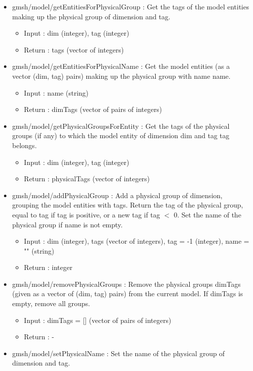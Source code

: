 \documentclass[dvipdfmx, 9pt, a4paper]{article}
\numberwithin{equation}{section}
\begin{document}
\begin{itemize}
\item gmsh/model/getEntitiesForPhysicalGroup : Get the tags of the model entities making up the physical group of dimension and tag.
\begin{itemize}
\item Input : dim (integer), tag (integer)
\item Return : tags (vector of integers)
\end{itemize}
\item gmsh/model/getEntitiesForPhysicalName : Get the model entities (as a vector (dim, tag) pairs) making up the physical group
with name name.
\begin{itemize}
\item Input : name (string)
\item Return : dimTags (vector of pairs of integers)
\end{itemize}
\item gmsh/model/getPhysicalGroupsForEntity : Get the tags of the physical groups (if any) to which the model entity of dimension dim and tag tag belongs.
\begin{itemize}
\item Input : dim (integer), tag (integer)
\item Return : physicalTags (vector of integers)
\end{itemize}
\item gmsh/model/addPhysicalGroup : Add a physical group of dimension, grouping the model entities with tags. Return the tag of the physical group, equal to tag if tag is positive, or a new tag if tag $<$ 0. Set the name of the physical group if name is not empty.
\begin{itemize}
\item Input : dim (integer), tags (vector of integers), tag = -1 (integer), name = "" (string)
\item Return : integer
\end{itemize}
\item gmsh/model/removePhysicalGroups : Remove the physical groups dimTags (given as a vector of (dim, tag) pairs) from the current model. If dimTags is empty, remove all groups.
\begin{itemize}
\item Input : dimTags = [] (vector of pairs of integers)
\item Return : -
\end{itemize}
\item gmsh/model/setPhysicalName : Set the name of the physical group of dimension and tag.

\end{itemize}
\end{document}
